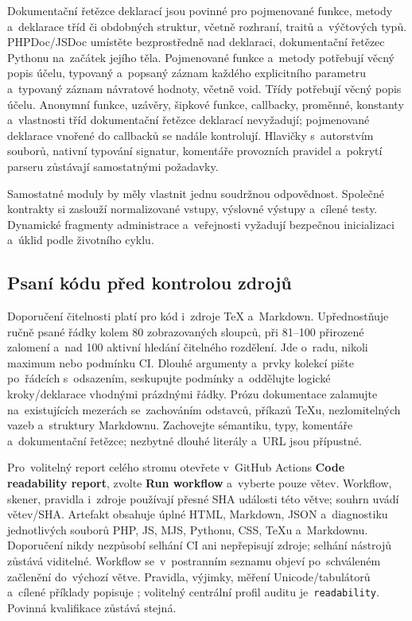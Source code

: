 \documentclass[11pt,a4paper]{article}
\newcommand{\filepath}[1]{\path{#1}}
\newcommand{\ui}[1]{\textbf{#1}}
\newcommand{\codeword}[1]{\nolinkurl{#1}}
\begin{document}
Dokumentační řetězce deklarací jsou povinné pro pojmenované funkce, metody
a~deklarace tříd či obdobných struktur, včetně rozhraní, traitů a~výčtových
typů. PHPDoc/JSDoc umístěte bezprostředně nad deklaraci, dokumentační řetězec
Pythonu na~začátek jejího těla. Pojmenované funkce a~metody potřebují věcný
popis účelu, typovaný a~popsaný záznam každého explicitního parametru a~typovaný
záznam návratové hodnoty, včetně void. Třídy potřebují věcný popis účelu.
Anonymní funkce, uzávěry, šipkové funkce, callbacky, proměnné, konstanty
a~vlastnosti tříd dokumentační řetězce deklarací nevyžadují; pojmenované
deklarace vnořené do callbacků se nadále kontrolují. Hlavičky s~autorstvím
souborů, nativní typování signatur, komentáře provozních pravidel a~pokrytí
parseru zůstávají samostatnými požadavky.

Samostatné moduly by měly vlastnit jednu soudržnou odpovědnost. Společné
kontrakty si zaslouží normalizované vstupy, výslovné výstupy a~cílené testy.
Dynamické fragmenty administrace a~veřejnosti vyžadují bezpečnou inicializaci
a~úklid podle životního cyklu.

\subsection{Psaní kódu před kontrolou zdrojů}

Doporučení čitelnosti platí pro kód i~zdroje TeX a~Markdown. Upřednostňuje
ručně psané řádky kolem 80 zobrazovaných sloupců, při 81--100 přirozené
zalomení a~nad 100 aktivní hledání čitelného rozdělení. Jde o~radu, nikoli
maximum nebo podmínku CI. Dlouhé argumenty a~prvky kolekcí pište po~řádcích
s~odsazením, seskupujte podmínky a~oddělujte logické kroky/deklarace vhodnými
prázdnými řádky. Prózu dokumentace zalamujte na~existujících mezerách
se~zachováním odstavců, příkazů TeXu, nezlomitelných vazeb a~struktury
Markdownu.
Zachovejte sémantiku, typy, komentáře a~dokumentační řetězce; nezbytné dlouhé
literály a~URL jsou přípustné.

Pro~volitelný report celého stromu otevřete v~GitHub Actions
\ui{Code readability report}, zvolte \ui{Run workflow} a~vyberte pouze větev.
Workflow, skener, pravidla i~zdroje používají přesné SHA události této větve;
souhrn uvádí větev/SHA. Artefakt obsahuje úplné HTML, Markdown, JSON
a~diagnostiku jednotlivých souborů PHP, JS, MJS, Pythonu, CSS, TeXu
a~Markdownu. Doporučení nikdy nezpůsobí selhání CI ani nepřepisují zdroje;
selhání nástrojů zůstává viditelné. Workflow se~v~postranním seznamu objeví
po~schváleném začlenění do~výchozí větve. Pravidla, výjimky, měření
Unicode/tabulátorů a~cílené příklady popisuje
\filepath{docs/CODE_READABILITY.md}; volitelný centrální profil auditu
je~\codeword{readability}. Povinná kvalifikace zůstává stejná.
\end{document}
